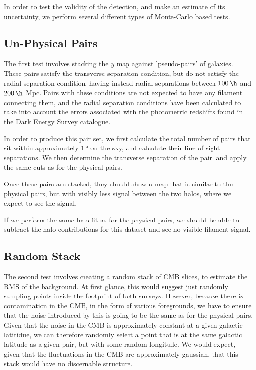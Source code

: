 In order to test the validity of the detection, and make an estimate of its uncertainty, we perform several different types of Monte-Carlo based tests. 

\subsection{Un-Physical Pairs}
The first test involves stacking the $y$ map against 'pseudo-pairs' of galaxies. These pairs satisfy the transverse separation condition, but do not satisfy the radial separation condition, having instead radial separations between $\SI{100}{\per\h}$ and $\SI{200}{\per\h}$ Mpc. Pairs with these conditions are not expected to have any filament connecting them, and the radial separation conditions have been calculated to take into account the errors associated with the photometric redshifts found in the Dark Energy Survey catalogue. 
\par In order to produce this pair set, we first calculate the total number of pairs that sit within approximately $\SI{1}{\degree}$ on the sky, and calculate their line of sight separations. We then determine the transverse separation of the pair, and apply the same cuts as for the physical pairs. 
\par Once these pairs are stacked, they should show a map that is similar to the physical pairs, but with visibly less signal between the two halos, where we expect to see the signal. 
\par If we perform the same halo fit as for the physical pairs, we should be able to subtract the halo contributions for this dataset and see no visible filament signal. 
\subsection{Random Stack}
The second test involves creating a random stack of CMB slices, to estimate the RMS of the background. At first glance, this would suggest just randomly sampling points inside the footprint of both surveys. However, because there is contamination in the CMB, in the form of various foregrounds, we have to ensure that the noise introduced by this is going to be the same as for the physical pairs. Given that the noise in the CMB is approximately constant at a given galactic latitidue, we can therefore randomly select a point that is at the same galactic latitude as a given pair, but with some random longitude. We would expect, given that the fluctuations in the CMB are approximately gaussian, that this stack would have no discernable structure.